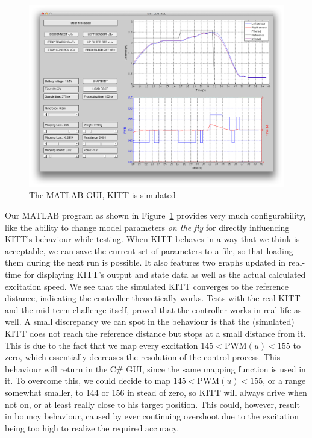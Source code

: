 \documentclass[11pt,titlepage]{report}
\begin{document}
\begin{figure}[H]
	\centering
	\includegraphics[width=\linewidth]{resource/gui-matlab.png}
	\caption{The MATLAB GUI, KITT is simulated}
	\label{fig:int-gui-matlab}
\end{figure}

Our MATLAB program as shown in Figure~\ref{fig:int-gui-matlab} provides very much configurability, like the ability to change model parameters \textit{on the fly} for directly influencing KITT's behaviour while testing. When KITT behaves in a way that we think is acceptable, we can save the current set of parameters to a file, so that loading them during the next run is possible. It also features two graphs updated in real-time for displaying KITT's output and state data as well as the actual calculated excitation speed. We see that the simulated KITT converges to the reference distance, indicating the controller theoretically works. Tests with the real KITT and the mid-term challenge itself, proved that the controller works in real-life as well.
A small discrepancy we can spot in the behaviour is that the (simulated) KITT does not reach the reference distance but stops at a small distance from it. This is due to the fact that we map every excitation $145 < \text{PWM}(u) < 155$ to zero, which essentially decreases the resolution of the control process. This behaviour will return in the C\# GUI, since the same mapping function is used in it. To overcome this, we could decide to map $145 < \text{PWM}(u) < 155$, or a range somewhat smaller, to \num{144} or \num{156} in stead of zero, so KITT will always drive when not on, or at least really close to his target position. This could, however, result in bouncy behaviour, caused by ever continuing overshoot due to the excitation being too high to realize the required accuracy. 
\end{document}
